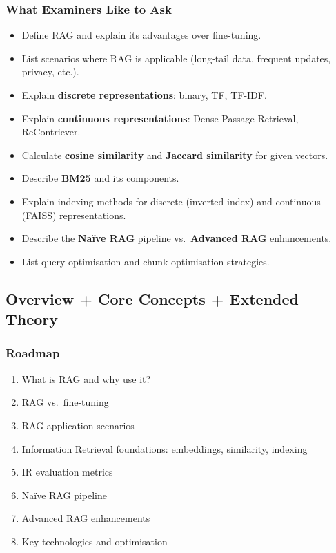\subsubsection*{What Examiners Like to Ask}

\begin{itemize}
  \item Define RAG and explain its advantages over fine-tuning.
  \item List scenarios where RAG is applicable (long-tail data, frequent updates, privacy, etc.).
  \item Explain \textbf{discrete representations}: binary, TF, TF-IDF.
  \item Explain \textbf{continuous representations}: Dense Passage Retrieval, ReContriever.
  \item Calculate \textbf{cosine similarity} and \textbf{Jaccard similarity} for given vectors.
  \item Describe \textbf{BM25} and its components.
  \item Explain indexing methods for discrete (inverted index) and continuous (FAISS) representations.
  \item Describe the \textbf{Na\"ive RAG} pipeline vs.\ \textbf{Advanced RAG} enhancements.
  \item List query optimisation and chunk optimisation strategies.
\end{itemize}

\bigseparator

\subsection{Overview + Core Concepts + Extended Theory}

\subsubsection*{Roadmap}
\begin{enumerate}
  \item What is RAG and why use it?
  \item RAG vs.\ fine-tuning
  \item RAG application scenarios
  \item Information Retrieval foundations: embeddings, similarity, indexing
  \item IR evaluation metrics
  \item Na\"ive RAG pipeline
  \item Advanced RAG enhancements
  \item Key technologies and optimisation
\end{enumerate}

